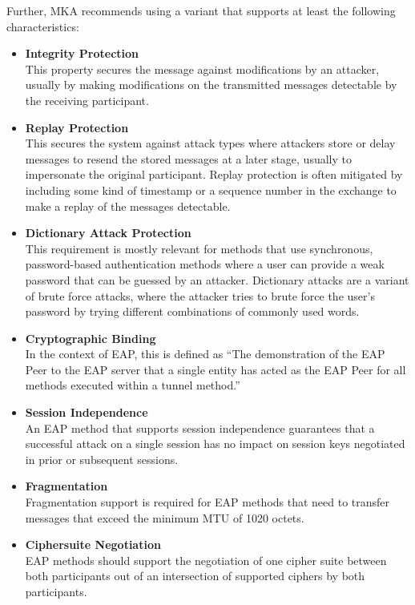 Further, MKA recommends using a variant that supports at least the following characteristics:
\begin{itemize}
    \setlength{\itemsep}{0pt}
    \item \textbf{Integrity Protection} \\
    This property secures the message against modifications by an attacker, usually by making modifications on the transmitted messages detectable by the receiving participant.
    \item \textbf{Replay Protection} \\
    This secures the system against attack types where attackers store or delay messages to resend the stored messages at a later stage, usually to impersonate the original participant. Replay protection is often mitigated by including some kind of timestamp or a sequence number in the exchange to make a replay of the messages detectable.
    \item \textbf{Dictionary Attack Protection} \\
    This requirement is mostly relevant for methods that use synchronous, password-based authentication methods where a user can provide a weak password that can be guessed by an attacker. Dictionary attacks are a variant of brute force attacks, where the attacker tries to brute force the user's password by trying different combinations of commonly used words.
    \item \textbf{Cryptographic Binding} \\
    In the context of \ac{EAP}, this is defined as ``The demonstration of the \ac{EAP} Peer to the \ac{EAP} server that a single
    entity has acted as the \ac{EAP} Peer for all methods executed within a tunnel method.''\cite{rfc3748}
    \item \textbf{Session Independence} \\
    An \ac{EAP} method that supports session independence guarantees that a successful attack on a single session has no impact on session keys negotiated in prior or subsequent sessions.  
    \item \textbf{Fragmentation} \\
    Fragmentation support is required for \ac{EAP} methods that need to transfer messages that exceed the minimum MTU of 1020 octets\cite{rfc3748}.
    \item \textbf{Ciphersuite Negotiation} \\
    \ac{EAP} methods should support the negotiation of one cipher suite between both participants out of an intersection of supported ciphers by both participants.
\end{itemize}

